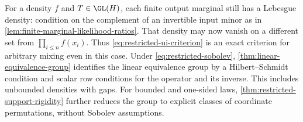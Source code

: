 For a density \(f\) and \(T\in\GL(H)\), each finite output
marginal still has a Lebesgue density: condition on the complement
of an invertible input minor as in
\cref{lem:finite-marginal-likelihood-ratios}.
That density may now vanish on a different set from
\(\prod_{i\leq n}f(x_i)\).
Thus \eqref{eq:restricted-ui-criterion} is an exact criterion for
arbitrary mixing even in this case.
Under \eqref{eq:restricted-sobolev},
\cref{thm:linear-equivalence-group} identifies the linear equivalence
group by a Hilbert--Schmidt condition and scalar row conditions for the
operator and its inverse.  This includes unbounded densities with gaps.
For bounded and one-sided laws,
\cref{thm:restricted-support-rigidity} further reduces the group to
explicit classes of coordinate permutations, without Sobolev assumptions.
